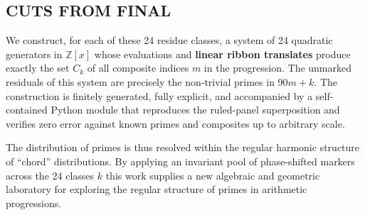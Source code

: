 \documentclass[11pt,a4paper]{article}
\begin{document}
\subsection{CUTS FROM FINAL }
We construct, for each of these 24 residue classes, a system of 24 quadratic generators in \(\mathbb{Z}[x]\) whose evaluations and \textbf{linear ribbon translates} produce exactly the set \(C_k\) of all composite indices \(m\) in the progression. The unmarked residuals of this system are precisely the non-trivial primes in \(90m+k\). The construction is finitely generated, fully explicit, and accompanied by a self-contained Python module that reproduces the ruled-panel superposition and verifies zero error against known primes and composites up to arbitrary scale.

The distribution of primes is thus resolved within the regular harmonic structure of “chord” distributions. By applying an invariant pool of phase-shifted markers across the 24 classes \(k\) this work supplies a new algebraic and geometric laboratory for exploring the regular structure of primes in arithmetic progressions.
\end{document}
